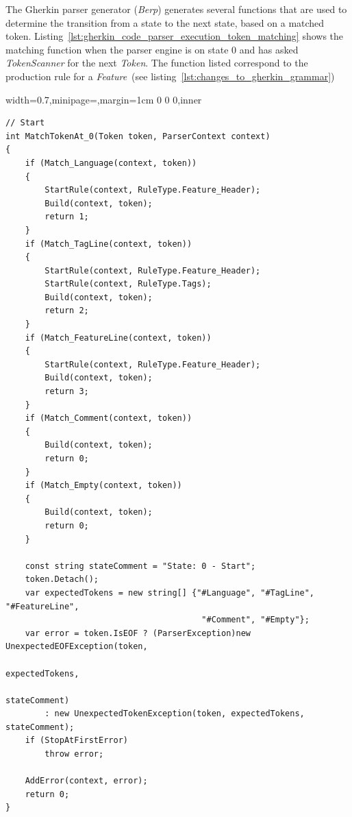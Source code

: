 \documentclass[dissertation,final]{softeng}
\newenvironment{featurecode}[1]
{ \lrbox\featurebox \begin{adjustbox}{width=#1\textwidth,minipage=\textwidth,margin=1cm 0 0 0,inner} }
{ \end{adjustbox}\endlrbox}
\newenvironment{featurelist}[2]
{
\newcommand{\setcaption}{\caption{#1}}
\newcommand{\setlabel}{\label{#2}}
}
{\begin{listing}[h!]\centering\usebox\featurebox\setcaption\setlabel\end{listing}}
\begin{document}
The Gherkin parser generator (\emph{Berp}) generates several functions that are used to determine the transition from a state to the next state, based on a matched token. Listing~\ref{lst:gherkin_code_parser_execution_token_matching} shows the matching function when the parser engine is on state $0$ and has asked \emph{TokenScanner} for the next \emph{Token}. The function listed correspond to the production rule for a \emph{Feature}~(see listing~\ref{lst:changes_to_gherkin_grammar})

\begin{featurelist}{Parser execution -- Token Matching }{lst:gherkin_code_parser_execution_token_matching}
\begin{featurecode}{0.7}
\begin{verbatim}
// Start
int MatchTokenAt_0(Token token, ParserContext context)
{
    if (Match_Language(context, token))
    {
        StartRule(context, RuleType.Feature_Header);
        Build(context, token);
        return 1;
    }
    if (Match_TagLine(context, token))
    {
        StartRule(context, RuleType.Feature_Header);
        StartRule(context, RuleType.Tags);
        Build(context, token);
        return 2;
    }
    if (Match_FeatureLine(context, token))
    {
        StartRule(context, RuleType.Feature_Header);
        Build(context, token);
        return 3;
    }
    if (Match_Comment(context, token))
    {
        Build(context, token);
        return 0;
    }
    if (Match_Empty(context, token))
    {
        Build(context, token);
        return 0;
    }
    
    const string stateComment = "State: 0 - Start";
    token.Detach();
    var expectedTokens = new string[] {"#Language", "#TagLine", "#FeatureLine",
                                        "#Comment", "#Empty"};
    var error = token.IsEOF ? (ParserException)new UnexpectedEOFException(token,
                                                                          expectedTokens,
                                                                          stateComment) 
        : new UnexpectedTokenException(token, expectedTokens, stateComment);
    if (StopAtFirstError)
        throw error;
    
    AddError(context, error);
    return 0;
}
\end{verbatim}
\end{featurecode}
\end{featurelist}
\clearpage
\end{document}
